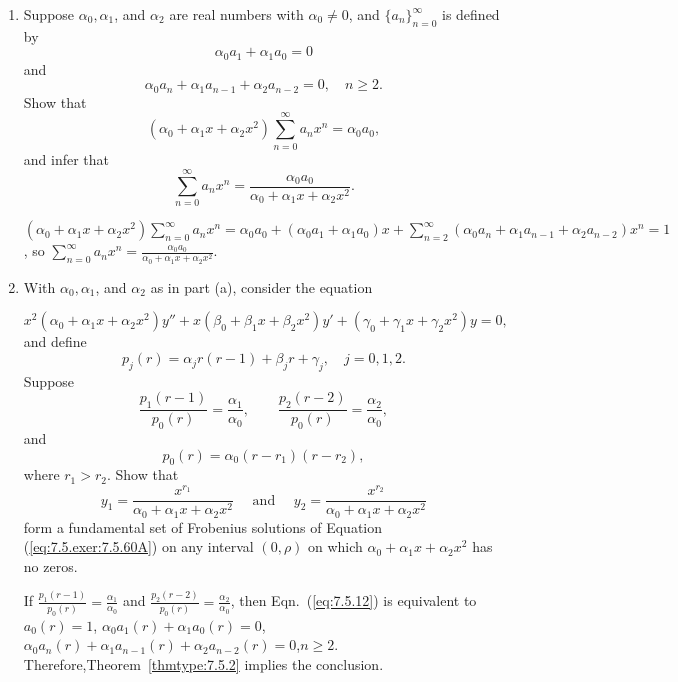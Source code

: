 \documentclass{ximera}
\begin{document}
\begin{problem}\label{exer:7.5.60}
\begin{enumerate}
\item %
Suppose $\alpha_0,\alpha_1$, and $\alpha_2$ are real numbers with
$\alpha_0\ne0$, and  $\{a_n\}_{n=0}^\infty$ is
defined by
$$
\alpha_0a_1+\alpha_1a_0=0
$$
and
$$
\alpha_0a_n+\alpha_1a_{n-1}+\alpha_2a_{n-2}=0,\quad n\geq 2.
$$
Show that
$$
(\alpha_0+\alpha_1x+\alpha_2x^2)\sum_{n=0}^\infty a_nx^n=\alpha_0a_0,
$$
and infer that
$$
\sum_{n=0}^\infty
a_nx^n=\frac{\alpha_0a_0}{\alpha_0+\alpha_1x+\alpha_2x^2}.
$$

\begin{solution}
    $(\alpha_0+\alpha_1x+\alpha_2x^2)\sum_{n=0}^\infty a_nx^n=
\alpha_0a_0+ (\alpha_0a_1+\alpha_1a_0)x+
\sum_{n=2}^\infty(\alpha_0a_n+\alpha_1a_{n-1}+\alpha_2a_{n-2})x^n=1$,
so $\sum_{n=0}^\infty
a_nx^n=\frac{\alpha_0a_0}{\alpha_0+\alpha_1x+\alpha_2x^2}$.
\end{solution}

\item %
With $\alpha_0,\alpha_1$, and $\alpha_2$ as in part (a), consider the
equation

\begin{equation} \label{eq:7.5.exer:7.5.60A}
x^2(\alpha_0+\alpha_1x+\alpha_2 x^2)y''+x(\beta_0+\beta_1x+\beta_2x^2)y'+
(\gamma_0+\gamma_1x+\gamma_2x^2)y=0,
\end{equation}
and define
$$
p_j(r)=\alpha_jr(r-1)+\beta_jr+\gamma_j,\quad j=0,1,2.
$$
Suppose
$$
\frac{p_1(r-1)}{p_0(r)}=
\frac{\alpha_1}{\alpha_0},\qquad
\frac{p_2(r-2)}{p_0(r)}=
\frac{\alpha_2}{\alpha_0},
$$
and
$$
p_0(r)=\alpha_0(r-r_1)(r-r_2),
$$
where $r_1>r_2$.  Show that
$$
y_1=\frac{x^{r_1}}{\alpha_0+\alpha_1x+\alpha_2x^2}\quad\mbox{ and }\quad
y_2=\frac{x^{r_2}}{\alpha_0+\alpha_1x+\alpha_2x^2}
$$
form a fundamental set of  Frobenius  solutions of Equation 
(\ref{eq:7.5.exer:7.5.60A}) on any interval $(0,\rho)$ on which
$\alpha_0+\alpha_1x+\alpha_2x^2$ has no zeros.

\begin{solution}
    If
$\frac{p_1(r-1)}{ p_0(r)}=
\frac{\alpha_1}{\alpha_0}$ and
$\frac{p_2(r-2)}{ p_0(r)}=
\frac{\alpha_2}{\alpha_0}$, then Eqn.~(\ref{eq:7.5.12}) is equivalent to
$a_0(r)=1$, $\alpha_0a_1(r)+\alpha_1a_0(r)=0$, $\alpha_0a_n(r)
+\alpha_1a_{n-1}(r)+\alpha_2a_{n-2}(r)=0$,\quad  $n\geq 2$.
Therefore,Theorem~\ref{thmtype:7.5.2} implies the conclusion.
\end{solution}
\end{enumerate}
\end{problem}
\end{document}
